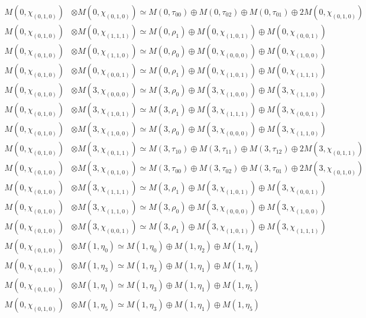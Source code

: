 \begin{align*}
M(0,\chi_{(0,1,0)}) &\otimes M(0,\chi_{(0,1,0)}) \simeq M(0,\tau_{00}) \oplus M(0,\tau_{02}) \oplus M(0,\tau_{01}) \oplus 2 M(0,\chi_{(0,1,0)})\\
M(0,\chi_{(0,1,0)}) &\otimes M(0,\chi_{(1,1,1)}) \simeq M(0,\rho_{1}) \oplus M(0,\chi_{(1,0,1)}) \oplus M(0,\chi_{(0,0,1)})\\
M(0,\chi_{(0,1,0)}) &\otimes M(0,\chi_{(1,1,0)}) \simeq M(0,\rho_{0}) \oplus M(0,\chi_{(0,0,0)}) \oplus M(0,\chi_{(1,0,0)})\\
M(0,\chi_{(0,1,0)}) &\otimes M(0,\chi_{(0,0,1)}) \simeq M(0,\rho_{1}) \oplus M(0,\chi_{(1,0,1)}) \oplus M(0,\chi_{(1,1,1)})\\
M(0,\chi_{(0,1,0)}) &\otimes M(3,\chi_{(0,0,0)}) \simeq M(3,\rho_{0}) \oplus M(3,\chi_{(1,0,0)}) \oplus M(3,\chi_{(1,1,0)})\\
M(0,\chi_{(0,1,0)}) &\otimes M(3,\chi_{(1,0,1)}) \simeq M(3,\rho_{1}) \oplus M(3,\chi_{(1,1,1)}) \oplus M(3,\chi_{(0,0,1)})\\
M(0,\chi_{(0,1,0)}) &\otimes M(3,\chi_{(1,0,0)}) \simeq M(3,\rho_{0}) \oplus M(3,\chi_{(0,0,0)}) \oplus M(3,\chi_{(1,1,0)})\\
M(0,\chi_{(0,1,0)}) &\otimes M(3,\chi_{(0,1,1)}) \simeq M(3,\tau_{10}) \oplus M(3,\tau_{11}) \oplus M(3,\tau_{12}) \oplus 2 M(3,\chi_{(0,1,1)})\\
M(0,\chi_{(0,1,0)}) &\otimes M(3,\chi_{(0,1,0)}) \simeq M(3,\tau_{00}) \oplus M(3,\tau_{02}) \oplus M(3,\tau_{01}) \oplus 2 M(3,\chi_{(0,1,0)})\\
M(0,\chi_{(0,1,0)}) &\otimes M(3,\chi_{(1,1,1)}) \simeq M(3,\rho_{1}) \oplus M(3,\chi_{(1,0,1)}) \oplus M(3,\chi_{(0,0,1)})\\
M(0,\chi_{(0,1,0)}) &\otimes M(3,\chi_{(1,1,0)}) \simeq M(3,\rho_{0}) \oplus M(3,\chi_{(0,0,0)}) \oplus M(3,\chi_{(1,0,0)})\\
M(0,\chi_{(0,1,0)}) &\otimes M(3,\chi_{(0,0,1)}) \simeq M(3,\rho_{1}) \oplus M(3,\chi_{(1,0,1)}) \oplus M(3,\chi_{(1,1,1)})\\
M(0,\chi_{(0,1,0)}) &\otimes M(1,\eta_{0}) \simeq M(1,\eta_{0}) \oplus M(1,\eta_{2}) \oplus M(1,\eta_{4})\\
M(0,\chi_{(0,1,0)}) &\otimes M(1,\eta_{3}) \simeq M(1,\eta_{3}) \oplus M(1,\eta_{1}) \oplus M(1,\eta_{5})\\
M(0,\chi_{(0,1,0)}) &\otimes M(1,\eta_{1}) \simeq M(1,\eta_{3}) \oplus M(1,\eta_{1}) \oplus M(1,\eta_{5})\\
M(0,\chi_{(0,1,0)}) &\otimes M(1,\eta_{5}) \simeq M(1,\eta_{3}) \oplus M(1,\eta_{1}) \oplus M(1,\eta_{5})\\

\end{align*}
